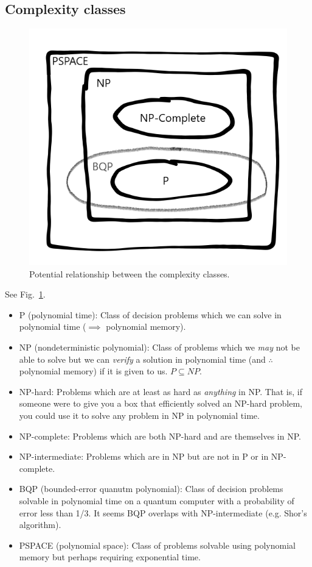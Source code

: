 \documentclass[12pt]{article}
\begin{document}
\subsection{Complexity classes}
\begin{figure}[htpb]
    \centering
    \includegraphics[width=0.5\linewidth]{complexity.png}
    \caption{Potential relationship between the complexity classes.}%
    \label{fig:complexity}
\end{figure}
See Fig.~\ref{fig:complexity}.
\begin{itemize}
    \item P (polynomial time): Class of decision problems which we can
        solve in polynomial time ($\implies$ polynomial memory).
    \item NP (nondeterministic polynomial): Class of problems which we
        \emph{may} not be able to solve but we can \emph{verify} a solution in
        polynomial time (and $\therefore$ polynomial memory) if it is given to
        us. $P \subseteq NP$.
    \item NP-hard: Problems which are at least as hard as \emph{anything} in
        NP. That is, if someone were to give you a box that efficiently solved
        an NP-hard problem, you could use it to solve any problem in NP in
        polynomial time.
    \item NP-complete: Problems which are both NP-hard and are themselves in
        NP.
    \item NP-intermediate: Problems which are in NP but are not in P or in
        NP-complete.
    \item BQP (bounded-error quanutm polynomial): Class of decision problems
        solvable in polynomial time on a quantum computer with a probability of
        error less than 1/3. It seems BQP overlaps with NP-intermediate (e.g.
        Shor's algorithm).
    \item PSPACE (polynomial space): Class of problems solvable using
        polynomial memory but perhaps requiring exponential time.
\end{itemize}
\end{document}
